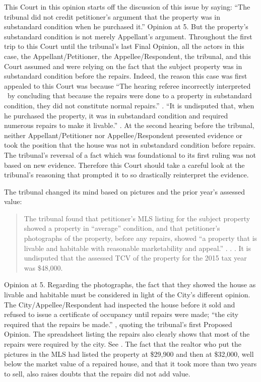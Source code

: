 \documentclass[12pt,\documentclassflag]{michiganCourtOfAppealsBrief}
\begin{document}
This Court in this opinion starts off the discussion of this issue by saying: ``The
tribunal did not credit petitioner's argument that the property was in substandard condition when
he purchased it.'' Opinion at 5. But the property's substandard condition is not merely Appellant's argument. Throughout the first trip to this Court until the tribunal's last Final Opinion, all the actors in this case, the Appellant/Petitioner, the Appellee/Respondent, the tribunal, and this Court assumed and were relying on the fact that the subject property was in substandard condition before the repairs. Indeed, the reason this case was first appealed to this Court was because ``The hearing referee incorrectly interpreted \mathieuGast\ by concluding that because the repairs were done to a property in substandard condition, they did not constitute normal repairs.'' . 
``It is undisputed that, when he purchased the property, it was in substandard condition and required numerous repairs to make it livable.'' . At the second hearing before the tribunal, neither Appellant/Petitioner nor Appellee/Respondent presented evidence or took the position that the house was not in substandard condition before repairs. The tribunal's reversal of a fact which was foundational to its first ruling was not based on new evidence. Therefore this Court should take a careful look at the tribunal's reasoning that prompted it to so drastically reinterpret the evidence.

The tribunal changed its mind based on pictures and the prior year's assessed value:

\begin{quote}
The tribunal found that
petitioner's MLS listing for the subject property showed a property in ``average'' condition, and
that petitioner's photographs of the property, before any repairs, showed ``a property that is livable
and habitable with reasonable marketability and appeal.'' . . .
It is undisputed that the assessed
TCV of the property for the 2015 tax year was \$48,000.
\end{quote}
Opinion at 5.
Regarding the photographs, the fact that they showed the house as livable and habitable must be considered in light of the City's different opinion. The City/Appellee/Respondent had inspected the house before it sold and refused to issue a certificate of occupancy until repairs were made; ``the city required that the repairs be made.'' , quoting the tribunal's first Proposed Opinion. The spreadsheet listing the repairs also clearly shows that most of the repairs were required by the city. See \repairs[]. The fact that the realtor who put the pictures in the MLS had listed the property at \$29,900 and then at \$32,000, well below the market value of a repaired house, and that it took more than two years to sell, also raises doubts that the repairs did not add value.
\end{document}
